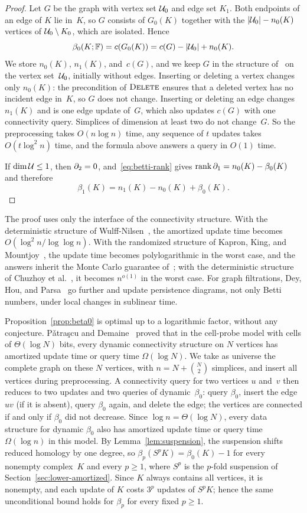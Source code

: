 \begin{proof}
Let $G$ be the graph with vertex set $\mathcal{U}_0$ and edge set $K_1$.
Both endpoints of an edge of $K$ lie in~$K$, so $G$ consists of $G_0(K)$ together with the $|\mathcal{U}_0|-n_0(K)$ vertices of $\mathcal{U}_0\setminus K_0$, which are isolated.
Hence
\[
  \beta_0(K;\mathbb{F})=c(G_0(K))=c(G)-|\mathcal{U}_0|+n_0(K).
\]
We store $n_0(K)$, $n_1(K)$, and~$c(G)$, and we keep $G$ in the structure of~\cite{HDT01} on the vertex set~$\mathcal{U}_0$, initially without edges.
Inserting or deleting a vertex changes only $n_0(K)$: the precondition of $\textsc{Delete}$ ensures that a deleted vertex has no incident edge in~$K$, so $G$ does not change.
Inserting or deleting an edge changes $n_1(K)$ and is one edge update of~$G$, which also updates $c(G)$ with one connectivity query.
Simplices of dimension at least two do not change~$G$.
So the preprocessing takes $O(n\log n)$ time, any sequence of $t$ updates takes $O(t\log^2n)$ time, and the formula above answers a query in $O(1)$ time.

If $\dim\mathcal{U}\le1$, then $\partial_2=0$, and~\eqref{eq:betti-rank} gives $\operatorname{rank}\partial_1=n_0(K)-\beta_0(K)$ and therefore
\[
  \beta_1(K)=n_1(K)-n_0(K)+\beta_0(K).
\]
\end{proof}

The proof uses only the interface of the connectivity structure.
With the deterministic structure of Wulff-Nilsen~\cite{WN13}, the amortized update time becomes $O(\log^2 n/\log\log n)$.
With the randomized structure of Kapron, King, and Mountjoy~\cite{KKM13}, the update time becomes polylogarithmic in the worst case, and the answers inherit the Monte Carlo guarantee of~\cite{KKM13}; with the deterministic structure of Chuzhoy et al.~\cite{CGLNPS20}, it becomes $n^{o(1)}$ in the worst case.
For graph filtrations, Dey, Hou, and Parsa~\cite{DHP23} go further and update persistence diagrams, not only Betti numbers, under local changes in sublinear time.

Proposition~\ref{prop:beta0} is optimal up to a logarithmic factor, without any conjecture.
P\v{a}tra\c{s}cu and Demaine~\cite{PD06} proved that in the cell-probe model with cells of $\Theta(\log N)$ bits, every dynamic connectivity structure on $N$ vertices has amortized update time or query time $\Omega(\log N)$.
We take as universe the complete graph on these $N$ vertices, with $n=N+\binom N2$ simplices, and insert all vertices during preprocessing.
A connectivity query for two vertices $u$ and~$v$ then reduces to two updates and two queries of dynamic~$\beta_0$: query $\beta_0$, insert the edge $uv$ (if it is absent), query $\beta_0$ again, and delete the edge; the vertices are connected if and only if $\beta_0$ did not decrease.
Since $\log n=\Theta(\log N)$, every data structure for dynamic $\beta_0$ also has amortized update time or query time $\Omega(\log n)$ in this model.
By Lemma~\ref{lem:suspension}, the suspension shifts reduced homology by one degree, so $\beta_{p}(S^{p}K)=\beta_0(K)-1$ for every nonempty complex~$K$ and every $p\ge1$, where $S^p$ is the $p$-fold suspension of Section~\ref{sec:lower-amortized}. Since $K$ always contains all vertices, it is nonempty, and each update of $K$ costs $3^p$ updates of $S^pK$; hence the same unconditional bound holds for $\beta_p$ for every fixed $p\ge1$.

